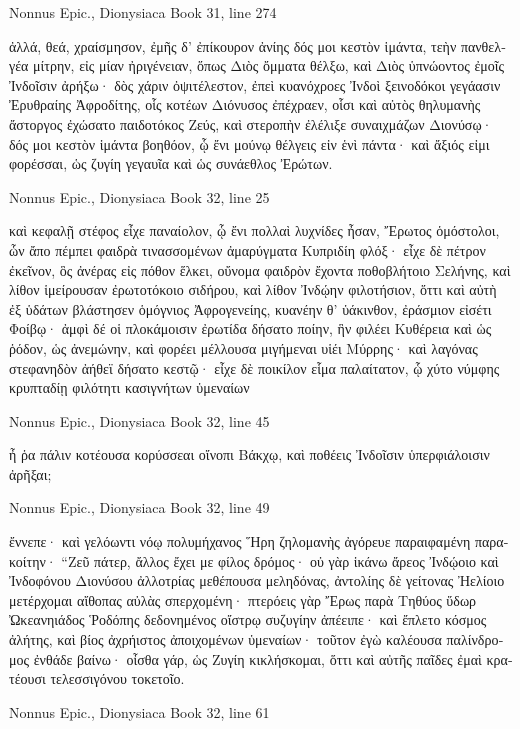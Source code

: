 \documentclass[12pt,letterpaper,twoside,final]{memoir}
\begin{document}
\begin{greek}
Nonnus Epic., Dionysiaca 
Book 31, line 274

ἀλλά, θεά, χραίσμησον, ἐμῆς δ' ἐπίκουρον ἀνίης 
δός μοι κεστὸν ἱμάντα, τεὴν πανθελγέα μίτρην, 
εἰς μίαν ἠριγένειαν, ὅπως Διὸς ὄμματα θέλξω, 
καὶ Διὸς ὑπνώοντος ἐμοῖς Ἰνδοῖσιν ἀρήξω· 
δὸς χάριν ὀψιτέλεστον, ἐπεὶ κυανόχροες Ἰνδοὶ 
ξεινοδόκοι γεγάασιν Ἐρυθραίης Ἀφροδίτης,   
οἷς κοτέων Διόνυσος ἐπέχραεν, οἷσι καὶ αὐτὸς 
θηλυμανὴς ἄστοργος ἐχώσατο παιδοτόκος Ζεύς, 
καὶ στεροπὴν ἐλέλιξε συναιχμάζων Διονύσῳ· 
δός μοι κεστὸν ἱμάντα βοηθόον, ᾧ ἔνι μούνῳ 
θέλγεις εἰν ἑνὶ πάντα· καὶ ἄξιός εἰμι φορέσσαι, 
ὡς ζυγίη γεγαυῖα καὶ ὡς συνάεθλος Ἐρώτων. 



Nonnus Epic., Dionysiaca 
Book 32, line 25

καὶ κεφαλῇ στέφος εἶχε παναίολον, ᾧ ἔνι πολλαὶ 
λυχνίδες ἦσαν, Ἔρωτος ὁμόστολοι, ὧν ἄπο πέμπει 
φαιδρὰ τινασσομένων ἀμαρύγματα Κυπριδίη φλόξ· 
εἶχε δὲ πέτρον ἐκεῖνον, ὃς ἀνέρας εἰς πόθον ἕλκει, 
οὔνομα φαιδρὸν ἔχοντα ποθοβλήτοιο Σελήνης, 
καὶ λίθον ἱμείρουσαν ἐρωτοτόκοιο σιδήρου, 
καὶ λίθον Ἰνδῴην φιλοτήσιον, ὅττι καὶ αὐτὴ 
ἐξ ὑδάτων βλάστησεν ὁμόγνιος Ἀφρογενείης, 
κυανέην θ' ὑάκινθον, ἐράσμιον εἰσέτι Φοίβῳ· 
ἀμφὶ δέ οἱ πλοκάμοισιν ἐρωτίδα δήσατο ποίην, 
ἣν φιλέει Κυθέρεια καὶ ὡς ῥόδον, ὡς ἀνεμώνην, 
καὶ φορέει μέλλουσα μιγήμεναι υἱέι Μύρρης· 
καὶ λαγόνας στεφανηδὸν ἀήθεϊ δήσατο κεστῷ· 
εἶχε δὲ ποικίλον εἷμα παλαίτατον, ᾧ χύτο νύμφης 
κρυπταδίῃ φιλότητι κασιγνήτων ὑμεναίων 




Nonnus Epic., Dionysiaca 
Book 32, line 45

ἦ ῥα πάλιν κοτέουσα κορύσσεαι οἴνοπι Βάκχῳ, 
καὶ ποθέεις Ἰνδοῖσιν ὑπερφιάλοισιν ἀρῆξαι; 



Nonnus Epic., Dionysiaca 
Book 32, line 49

ἔννεπε· καὶ γελόωντι νόῳ πολυμήχανος Ἥρη 
ζηλομανὴς ἀγόρευε παραιφαμένη παρακοίτην· 
 “Ζεῦ πάτερ, ἄλλος ἔχει με φίλος δρόμος· οὐ γὰρ ἱκάνω 
ἄρεος Ἰνδῴοιο καὶ Ἰνδοφόνου Διονύσου 
ἀλλοτρίας μεθέπουσα μεληδόνας, ἀντολίης δὲ 
γείτονας Ἠελίοιο μετέρχομαι αἴθοπας αὐλὰς 
σπερχομένη· πτερόεις γὰρ Ἔρως παρὰ Τηθύος ὕδωρ 
Ὠκεανηιάδος Ῥοδόπης δεδονημένος οἴστρῳ 
συζυγίην ἀπέειπε· καὶ ἔπλετο κόσμος ἀλήτης, 
καὶ βίος ἀχρήιστος ἀποιχομένων ὑμεναίων· 
τοῦτον ἐγὼ καλέουσα παλίνδρομος ἐνθάδε βαίνω· 
οἶσθα γάρ, ὡς Ζυγίη κικλήσκομαι, ὅττι καὶ αὐτῆς 
παῖδες ἐμαὶ κρατέουσι τελεσσιγόνου τοκετοῖο. 



Nonnus Epic., Dionysiaca 
Book 32, line 61


\end{greek}
\end{document}
